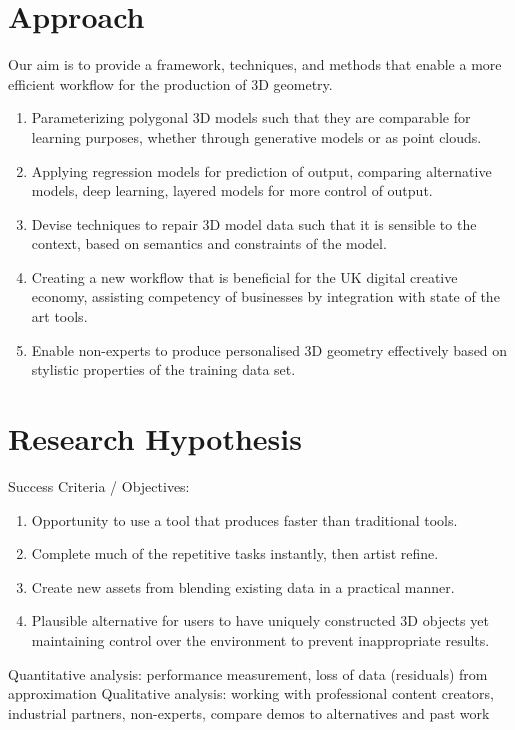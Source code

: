 \documentclass[a4paper, fontsize=15pt, onecolumn]{article} %
\numberwithin{equation}{section} %
\numberwithin{figure}{section} %
\numberwithin{table}{section} %
\begin{document}
\section{Approach}
Our aim is to provide a framework, techniques, and methods that enable a more efficient workflow for the production of 3D geometry.
\begin{enumerate}
	\item Parameterizing polygonal 3D models such that they are comparable for learning purposes, whether through generative models or as point clouds.
	\item Applying regression models for prediction of output, comparing alternative models, deep learning, layered models for more control of output.
	\item Devise techniques to repair 3D model data such that it is sensible to the context, based on semantics and constraints of the model.
	\item Creating a new workflow that is beneficial for the UK digital creative economy, assisting competency of businesses by integration with state of the art tools.
	\item Enable non-experts to produce personalised 3D geometry effectively based on stylistic properties of the training data set.
\end{enumerate}



\section{Research Hypothesis}
Success Criteria / Objectives: 
\begin{enumerate}
	\item Opportunity to use a tool that produces faster than traditional tools.
	\item Complete much of the repetitive tasks instantly, then artist refine.
	\item Create new assets from blending existing data in a practical manner.
	\item Plausible alternative for users to have uniquely constructed 3D objects yet maintaining control over the environment to prevent inappropriate results.
\end{enumerate}

Quantitative analysis: performance measurement, loss of data (residuals) from approximation
Qualitative analysis: working with professional content creators, industrial partners, non-experts, compare demos to alternatives and past work
\end{document}
